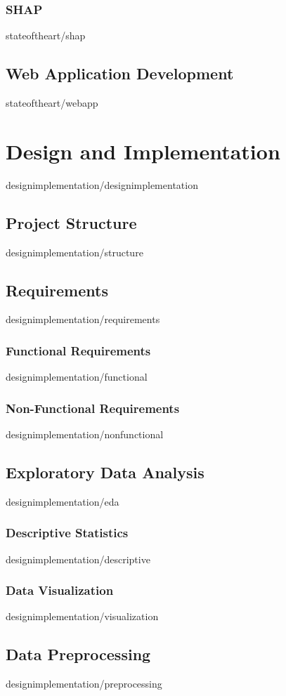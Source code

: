 \documentclass[covers, firstnumbered, tfg, extendedindex, epsbased, english, final]{tfgtfmthesisuam}
\begin{document}
\subsection{SHAP\label{SEC:SHAP}}{stateoftheart/shap}

\section{Web Application Development}{stateoftheart/webapp}

\chapter{Design and Implementation}{designimplementation/designimplementation}

\section{Project Structure}{designimplementation/structure}
\section{Requirements}{designimplementation/requirements}
\subsection{Functional Requirements}{designimplementation/functional}
\subsection{Non-Functional Requirements}{designimplementation/nonfunctional}
\section{Exploratory Data Analysis}{designimplementation/eda}
\subsection{Descriptive Statistics}{designimplementation/descriptive}
\subsection{Data Visualization}{designimplementation/visualization}
\section{Data Preprocessing}{designimplementation/preprocessing}
\end{document}
